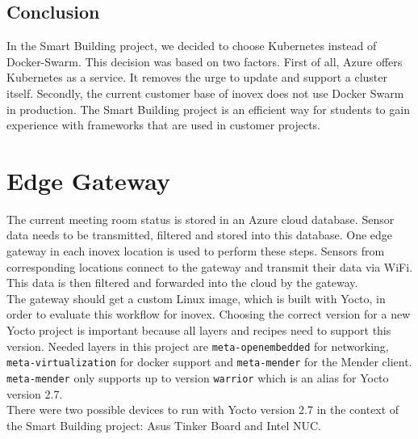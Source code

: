 \subsection{Conclusion}
In the Smart Building project, we decided to choose Kubernetes instead of Docker-Swarm. This decision was based on two factors. First of all, Azure offers Kubernetes as a service. It removes the urge to update and support a cluster itself. Secondly, the current customer base of inovex does not use Docker Swarm in production. The Smart Building project is an efficient way for students to gain experience with frameworks that are used in customer projects.

\section{Edge Gateway}
The current meeting room status is stored in an Azure cloud database. Sensor data needs to be transmitted, filtered and stored into this database. One edge gateway in each inovex location is used to perform these steps. Sensors from corresponding locations connect to the gateway and transmit their data via WiFi. This data is then filtered and forwarded into the cloud by the gateway.\\
The gateway should get a custom Linux image, which is built with Yocto, in order to evaluate this workflow for inovex. Choosing the correct version for a new Yocto project is important because all layers and recipes need to support this version. Needed layers in this project are \verb|meta-openembedded| for networking, \verb|meta-virtualization| for docker support and \verb|meta-mender| for the Mender client. \verb|meta-mender| only supports up to version \verb|warrior| which is an alias for Yocto version 2.7.\\
There were two possible devices to run with Yocto version 2.7 in the context of the Smart Building project: Asus Tinker Board and Intel NUC.
\newpage

